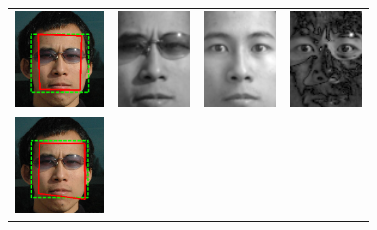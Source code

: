 \renewcommand{\tempheight}[0]{1.0in}
\begin{figure}
\centering
{
\begin{tabular}{cccc}
\includegraphics[height=\tempheight]{figures_pami/L1_cropped} &
\includegraphics[height=\tempheight]{figures_pami/y_warp_L1} &
\includegraphics[height=\tempheight]{figures_pami/y_hat_L1} &
\includegraphics[height=\tempheight]{figures_pami/e_L1} \\
\includegraphics[height=\tempheight]{figures_pami/L2_cropped} &

\end{tabular}}
\end{figure}
